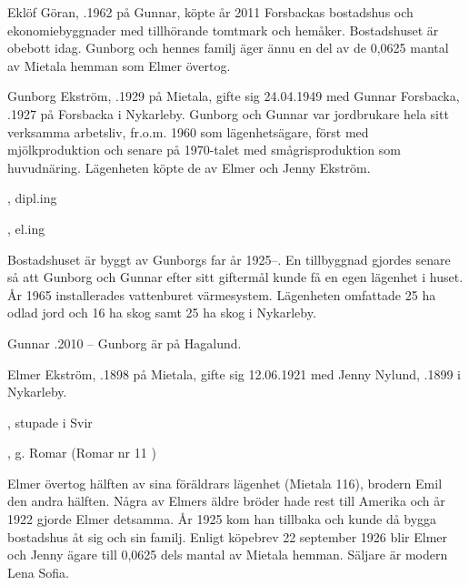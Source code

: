 
Eklöf Göran, .1962 på Gunnar, köpte år 2011 Forsbackas bostadshus och ekonomiebyggnader med tillhörande tomtmark och hemåker. Bostadshuset är obebott idag. Gunborg och hennes familj äger ännu en del av de 0,0625 mantal av Mietala hemman som Elmer övertog.


Gunborg Ekström, .1929 på Mietala, gifte sig 24.04.1949 med Gunnar Forsbacka, .1927 på Forsbacka i Nykarleby. Gunborg och Gunnar var jordbrukare hela sitt verksamma arbetsliv, fr.o.m. 1960 som lägenhetsägare, först med mjölkproduktion och senare på 1970-talet med smågrisproduktion som huvudnäring. Lägenheten köpte de av Elmer och Jenny Ekström.
\begin{jhchildren}
  \item {}, dipl.ing
  \item {}, el.ing
\end{jhchildren}

Bostadshuset är byggt av Gunborgs far år 1925--. En tillbyggnad gjordes senare så att Gunborg och Gunnar efter sitt
giftermål kunde få en egen lägenhet i huset. År 1965 installerades vattenburet värmesystem. Lägenheten omfattade 25 ha odlad jord och 16 ha skog samt 25 ha skog i Nykarleby.

Gunnar .2010  --  Gunborg är på Hagalund.


Elmer Ekström, .1898 på Mietala, gifte sig 12.06.1921 med Jenny Nylund, .1899 i Nykarleby.
\begin{jhchildren}
  \item {}, stupade i Svir
  \item {}
  \item {}, g. Romar (Romar nr 11 )
\end{jhchildren}

Elmer övertog hälften av sina föräldrars lägenhet (Mietala 116), brodern Emil den andra hälften. Några av Elmers äldre bröder hade rest till  Amerika och år 1922 gjorde Elmer detsamma. År 1925 kom han tillbaka och kunde då bygga bostadshus åt sig och sin familj. Enligt köpebrev 22 september 1926 blir Elmer och Jenny ägare till 0,0625 dels mantal av Mietala hemman. Säljare är modern Lena Sofia.

